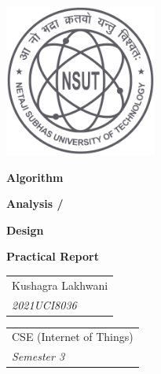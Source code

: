 \pagecolor{white}\afterpage{\nopagecolor}


\includegraphics[width=5cm]{images/NSUT.png}
\vspace{.7in}

\begin{singlespace}
    \fontsize{60}{65}\selectfont \textcolor{FSBlue}{\textbf{Algorithm}}

    \fontsize{60}{65}\selectfont \textcolor{FSBlue}{\textbf{Analysis /}}

    \fontsize{60}{65}\selectfont \textcolor{FSBlue}{\textbf{Design}}

    \vspace{5mm}
    \LARGE\textcolor{FSBlue}{\textbf{Practical Report}}

    \vfill

\end{singlespace}

\begin{singlespace}
    \LARGE

    \begin{tabular}{l}
        \textcolor{FSBlue}{Kushagra Lakhwani}    \\
        \textcolor{FSBlue}{\textit{2021UCI8036}} \\
    \end{tabular}

    \vspace{.2in}
    \begin{tabular}{l}
        \textcolor{FSBlue}{CSE (Internet of Things)} \\
        \textcolor{FSBlue}{\textit{Semester 3}}      \\
    \end{tabular}
\end{singlespace}

\thispagestyle{empty}
\restoregeometry
\newpage
